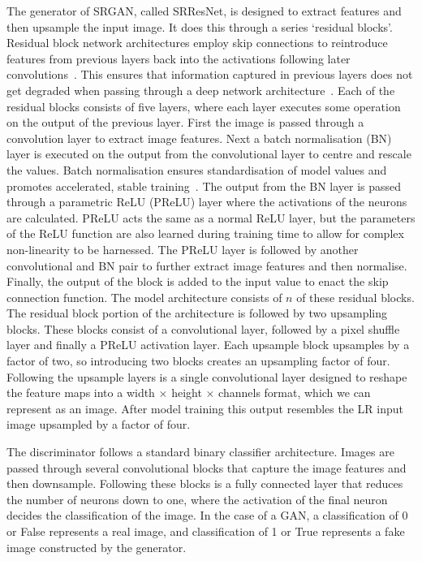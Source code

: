 The generator of SRGAN, called SRResNet, is designed to extract features and then upsample the input image. It does this through a series `residual blocks'. Residual block network architectures employ skip connections to reintroduce features from previous layers back into the activations following later convolutions~\cite{residualNets}. This ensures that information captured in previous layers does not get degraded when passing through a deep network architecture~\cite{residualNets}. Each of the residual blocks consists of five layers, where each layer executes some operation on the output of the previous layer. First the image is passed through a convolution layer to extract image features. Next a batch normalisation (BN) layer is executed on the output from the convolutional layer to centre and rescale the values. Batch normalisation ensures standardisation of model values and promotes accelerated, stable training~\cite{batchNorm}. The output from the BN layer is passed through a parametric ReLU (PReLU) layer where the activations of the neurons are calculated. PReLU acts the same as a normal ReLU layer, but the parameters of the ReLU function are also learned during training time to allow for complex non-linearity to be harnessed. The PReLU layer is followed by another convolutional and BN pair to further extract image features and then normalise. Finally, the output of the block is added to the input value to enact the skip connection function. The model architecture consists of $n$ of these residual blocks. The residual block portion of the architecture is followed by two upsampling blocks. These blocks consist of a convolutional layer, followed by a pixel shuffle layer and finally a PReLU activation layer. Each upsample block upsamples by a factor of two, so introducing two blocks creates an upsampling factor of four. Following the upsample layers is a single convolutional layer designed to reshape the feature maps into a width $\times$ height $\times$ channels format, which we can represent as an image. After model training this output resembles the LR input image upsampled by a factor of four.

The discriminator follows a standard binary classifier architecture. Images are passed through several convolutional blocks that capture the image features and then downsample. Following these blocks is a fully connected layer that reduces the number of neurons down to one, where the activation of the final neuron decides the classification of the image. In the case of a GAN, a classification of 0 or False represents a real image, and classification of 1 or True represents a fake image constructed by the generator. 

